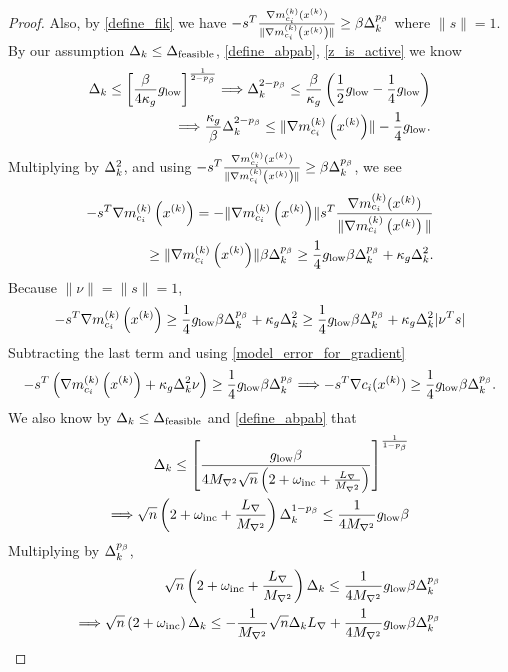 \begin{proof}
Also, by \cref{define_fik} we have $-s^T {\frac{\nabla m^{(k)}_{c_i}(x^{(k)})}{\|\nabla m^{(k)}_{c_i}\left(x^{(k)}\right)\|}} \ge \beta \Delta_k^{p_{\beta}}$ where $\|s\| = 1$.
By our assumption $\Delta_k \le {\Delta_{\textrm{feasible}}}$, \cref{define_abpab}, \cref{z_is_active} we know
\begin{align*}
\Delta_k \le \left[\frac{\beta}{4\kappa_g}{ g_{\textrm{low}} } \right]^{\frac 1 {2 - p_{\beta}}}
\Longrightarrow \Delta_k^{2 - p_{\beta}} \le \frac{\beta}{\kappa_g}\left(\frac 1 2{ g_{\textrm{low}} }  - \frac 1 4 { g_{\textrm{low}} } \right) \\
\Longrightarrow \frac{\kappa_g}{\beta} \Delta_k^{2 - p_{\beta}} \le \|{\nabla m_{c_i}^{(k)}\left(x^{(k)}\right)}\| - \frac 1 4 { g_{\textrm{low}} }.
\end{align*}
Multiplying by $\Delta_k^2$, and using $-s^T {\frac{\nabla m^{(k)}_{c_i}(x^{(k)})}{\|\nabla m^{(k)}_{c_i}\left(x^{(k)}\right)\|}} \ge \beta \Delta_k^{p_{\beta}}$, we see
\begin{align*}
-s^T{\nabla m_{c_i}^{(k)}\left(x^{(k)}\right)} =  -\|{\nabla m_{c_i}^{(k)}\left(x^{(k)}\right)}\|s^T{\frac{\nabla m^{(k)}_{c_i}(x^{(k)})}{\|\nabla m^{(k)}_{c_i}\left(x^{(k)}\right)\|}} \\
\ge \|{\nabla m_{c_i}^{(k)}\left(x^{(k)}\right)}\|\beta\Delta_k^{p_{\beta}} 
\ge \frac 1 4 { g_{\textrm{low}} }  \beta \Delta_k^{p_{\beta}} + \kappa_g\Delta_k^2.
\end{align*}
Because $\|\nu\| = \|s\| = 1$,
\begin{align*}
-s^T{\nabla m_{c_i}^{(k)}\left(x^{(k)}\right)} \ge \frac 1 4 { g_{\textrm{low}} }  \beta \Delta_k^{p_{\beta}} + \kappa_g\Delta_k^2 \ge \frac 1 4 { g_{\textrm{low}} }  \beta \Delta_k^{p_{\beta}} + \kappa_g\Delta_k^2|\nu^T s|
\end{align*}
Subtracting the last term and using \cref{model_error_for_gradient}
\begin{align}
-s^T\left({\nabla m_{c_i}^{(k)}\left(x^{(k)}\right)} + \kappa_g\Delta_k^2\nu\right) \ge \frac 1 4 { g_{\textrm{low}} }  \beta \Delta_k ^{p_{\beta}}
\Longrightarrow -s^T\nabla c_i(x^{(k)}) \ge \frac 1 4 { g_{\textrm{low}} }  \beta \Delta_k^{p_{\beta}}. \label{nsc_pos}
\end{align}
We also know by $\Delta_k \le {\Delta_{\textrm{feasible}}}$ and \cref{define_abpab} that
\begin{align*}
\Delta_k \le \left[\frac {{ g_{\textrm{low}} }  \beta} {4{M_{\nabla^2}}\sqrt{n}\left(2 + \omega_{\text{inc}} + \frac {{L_{\nabla}}} {{M_{\nabla^2}}} \right)}\right]^{\frac1 {1 - p_{\beta}} } \\
\Longrightarrow \sqrt{n}\left(2 + \omega_{\text{inc}} + \frac {{L_{\nabla}}} {{M_{\nabla^2}}} \right) \Delta_k^{1-p_{\beta}}\le \frac 1 {4{M_{\nabla^2}}} { g_{\textrm{low}} }  \beta
\end{align*}
Multiplying by $\Delta_k^{p_{\beta}}$,
\begin{align*}
\sqrt{n}\left(2 + \omega_{\text{inc}} + \frac {{L_{\nabla}}} {{M_{\nabla^2}}} \right) \Delta_k \le \frac 1 {4{M_{\nabla^2}}} { g_{\textrm{low}} }  \beta \Delta_k^{p_{\beta}} \\
\Longrightarrow \sqrt{n}\left(2 + \omega_{\text{inc}} \right) \Delta_k \le -\frac 1 {{M_{\nabla^2}}} \sqrt{n}\Delta_k {L_{\nabla}} + \frac 1 {4{M_{\nabla^2}}} { g_{\textrm{low}} }  \beta \Delta_k^{p_{\beta}}
\end{align*}

\end{proof}
